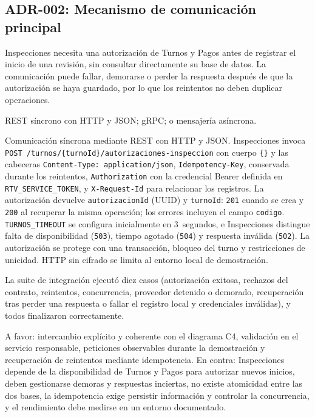 \documentclass[11pt,a4paper]{article}
\begin{document}
	\subsection{ADR-002: Mecanismo de comunicación principal}
	\begin{description}[leftmargin=3.2cm,style=nextline]
		\item[Contexto] Inspecciones necesita una autorización de Turnos y Pagos antes de registrar el inicio de una revisión, sin consultar directamente su base de datos. La comunicación puede fallar, demorarse o perder la respuesta después de que la autorización se haya guardado, por lo que los reintentos no deben duplicar operaciones.
		\item[Opciones] REST síncrono con HTTP y JSON; gRPC; o mensajería asíncrona.
		\item[Decisión] Comunicación síncrona mediante REST con HTTP y JSON. Inspecciones invoca \texttt{POST /turnos/\{turnoId\}/autorizaciones-inspeccion} con cuerpo \texttt{\{\}} y las cabeceras \texttt{Content-Type: application/json}, \texttt{Idempotency-Key}, conservada durante los reintentos, \texttt{Authorization} con la credencial Bearer definida en \texttt{RTV\_SERVICE\_TOKEN}, y \texttt{X-Request-Id} para relacionar los registros. La autorización devuelve \texttt{autorizacionId} (UUID) y \texttt{turnoId}: \texttt{201} cuando se crea y \texttt{200} al recuperar la misma operación; los errores incluyen el campo \texttt{codigo}. \texttt{TURNOS\_TIMEOUT} se configura inicialmente en 3~segundos, e Inspecciones distingue falta de disponibilidad (\texttt{503}), tiempo agotado (\texttt{504}) y respuesta inválida (\texttt{502}). La autorización se protege con una transacción, bloqueo del turno y restricciones de unicidad. HTTP sin cifrado se limita al entorno local de demostración.
		\item[Verificación] La suite de integración ejecutó diez casos (autorización exitosa, rechazos del contrato, reintentos, concurrencia, proveedor detenido o demorado, recuperación tras perder una respuesta o fallar el registro local y credenciales inválidas), y todos finalizaron correctamente.
		\item[Consecuencias] A favor: intercambio explícito y coherente con el diagrama C4, validación en el servicio responsable, peticiones observables durante la demostración y recuperación de reintentos mediante idempotencia. En contra: Inspecciones depende de la disponibilidad de Turnos y Pagos para autorizar nuevos inicios, deben gestionarse demoras y respuestas inciertas, no existe atomicidad entre las dos bases, la idempotencia exige persistir información y controlar la concurrencia, y el rendimiento debe medirse en un entorno documentado.
	\end{description}
	
\end{document}
